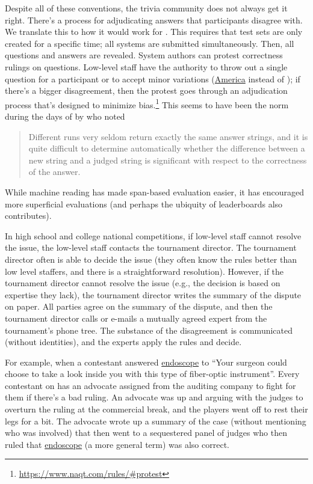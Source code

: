 Despite all of these conventions, the trivia community does not always get it right.
There's a process for adjudicating answers that participants disagree
with.  
We translate this to how it would work for .
This requires that test sets are only created for a specific time; all
systems are submitted simultaneously.
Then, all questions and answers are revealed.
System authors can protest correctness rulings on questions.
Low-level staff have the authority to throw out a single question for
a participant or to accept minor variations (\underline{America} instead
of \underline{}); if there's a bigger disagreement, then the protest goes
through an adjudication process that's designed to minimize
bias.\footnote{\url{https://www.naqt.com/rules/\#protest}}  
This seems to have been the norm during the days of  by  who noted
\begin{quote}
    Different  runs very seldom return exactly the same answer strings, and it is quite difficult to determine automatically whether the difference between a new string and a judged string is significant with respect to the correctness of the answer.
\end{quote} 
While machine reading has made span-based evaluation easier, it has encouraged more superficial evaluations (and perhaps the ubiquity of leaderboards also contributes).

In high school and college national competitions, if low-level staff cannot resolve the issue, the low-level staff contacts the tournament director.
The tournament director often is able to decide the issue (they often know the rules better than low level staffers, and there is a straightforward resolution).
However, if the tournament director cannot resolve the issue (e.g., the decision is based on expertise they lack), the tournament director writes the summary of the dispute on paper.
All parties agree on the summary of the dispute, and then the tournament director calls or e-mails a mutually agreed expert from the tournament's phone tree.
The substance of the disagreement is communicated (without identities), and the experts apply the rules and decide.

For example, when a 
\jeopardy{} contestant answered \underline{endoscope} to ``Your surgeon could choose to take a look inside you with this type of fiber-optic instrument''.
Every contestant on \jeopardy{} has an advocate assigned from the
auditing company to fight for them if there's a bad ruling.
An advocate was up and arguing with the
judges to overturn the ruling at the commercial break, and the players went off to rest their legs for a bit.
The advocate wrote up a summary of the case (without mentioning who was
involved) that then went to a sequestered panel of judges who then
ruled that \underline{endoscope} (a more general term) was also correct.

